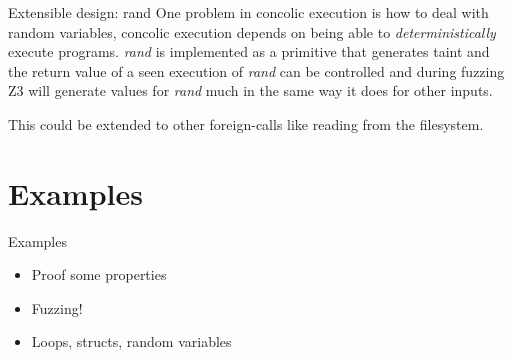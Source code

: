 \documentclass{beamer}
\begin{document}
  \begin{frame}
      \begin{block}{Extensible design: rand}
          One problem in concolic execution is how to deal with random variables, concolic execution depends on being able to \emph{deterministically} execute programs.
          \emph{rand} is implemented as a primitive that generates taint and the return value of a seen execution of \emph{rand} can be controlled and during fuzzing
          Z3 will generate values for \emph{rand} much in the same way it does for other inputs.

          This could be extended to other foreign-calls like reading from the filesystem.
      \end{block}
  \end{frame}
  \section{Examples}
  \begin{frame}{Examples}
    \begin{itemize}
        \item Proof some properties
        \item Fuzzing!
        \item Loops, structs, random variables
     \end{itemize}
  \end{frame}
\end{document}
